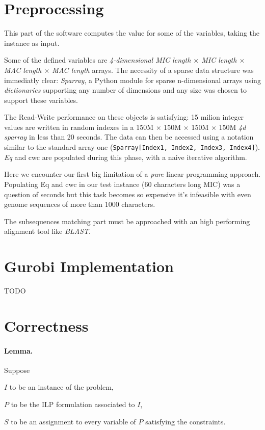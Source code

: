 \section{Preprocessing}
This part of the software computes the value for some of the variables, taking the instance as input.

Some of the defined variables are \textit{4-dimensional MIC length $\times$ MIC length $\times$ MAC length $\times$ MAC length} arrays. The necessity of a sparse data structure was immediatly clear: \textit{Sparray}, a Python module \cite{sparray} for sparse n-dimensional arrays using \textit{dictionaries} supporting any number of dimensions and any size was chosen to support these variables.

The Read-Write performance on these objects is satisfying: 15 milion integer values are written in random indexes in a 150M $\times$ 150M $\times$ 150M $\times$ 150M \textit{4d sparray} in less than 20 seconds. The data can then be accessed using a notation similar to the standard array one (\texttt{Sparray[Index1, Index2, Index3, Index4]}). \textit{Eq} and {cwc} are populated during this phase, with a naive iterative algorithm.

Here we encounter our first big limitation of a \textit{pure} linear programming approach. Populating Eq and cwc in our test instance (60 characters long MIC) was a question of seconds but this task becomes so expensive it's infeasible with even genome sequences of more than 1000 characters.

The subsequences matching part must be approached with an high performing alignment tool like \textit{BLAST}.

\section{Gurobi Implementation}
TODO

\section{Correctness}

\paragraph{Lemma.}
Suppose

$I$ to be an instance of the problem,

$P$ to be the ILP formulation associated to $I$,

$S$ to be an assignment to every variable of $P$ satisfying the constraints.

